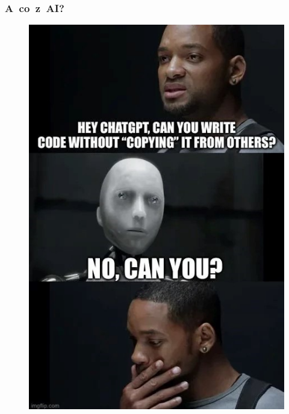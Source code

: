 \documentclass[10pt,t]{beamer}
\begin{document}
\begin{frame}
  \frametitle{A~co~z~AI?}

  \vspace{-0.5em}


  \begin{figure}

    \label{fig:Coping-for-others}

    \centering


    \includegraphics[scale=0.415]
    {./Presentations-pictures/Copying-from-others.jpg}

  \end{figure}

\end{frame}
\end{document}
